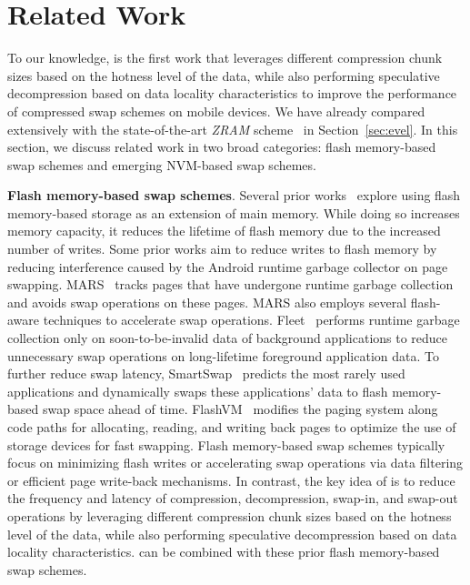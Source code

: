 \section{Related Work}

To our knowledge, \proposal is the first work that leverages different compression chunk sizes based on the hotness level of the data, while also performing speculative decompression based on data locality characteristics to improve the performance of compressed swap schemes on mobile devices.
We have already compared \proposal extensively with the state-of-the-art \emph{ZRAM} scheme~\cite{zram1} in Section~\ref{sec:evel}. In this section, we discuss related work in two broad categories: flash memory-based swap schemes and emerging NVM-based swap schemes.


\noindent\textbf{Flash memory-based swap schemes}.  
Several prior works~\cite{end2024more, bergman2022znswap, Changlong2020seal, guo2015mars, saxena2010flashvm, kim2017application, zhu2017revisiting, Samsung-Enable-Swap, Xiaomi-Enable-Swap, kim2019analysis} explore using flash memory-based storage as an extension of main memory. While doing so increases memory capacity, it reduces the lifetime of flash memory due to the increased number of writes. Some prior works\cite{guo2015mars,end2024more} aim to reduce writes to flash memory by reducing interference caused by the Android runtime garbage collector on page swapping.  MARS~\cite{guo2015mars} tracks pages that have undergone runtime garbage collection and avoids swap operations on these pages. MARS also employs several flash-aware techniques to accelerate swap operations. 
Fleet~\cite{end2024more} performs runtime garbage collection only on soon-to-be-invalid data of background applications to reduce unnecessary swap operations on long-lifetime foreground application data.
To further reduce swap latency, SmartSwap~\cite{zhu2017smartswap} predicts the most rarely used applications and dynamically swaps these applications' data to flash memory-based swap space ahead of time.
FlashVM~\cite{saxena2010flashvm} modifies the paging system along code paths for allocating, reading, and writing back pages to optimize the use of storage devices for fast swapping. Flash memory-based swap schemes typically focus on minimizing flash writes or accelerating swap operations via data filtering or efficient page write-back mechanisms. In contrast, the key idea of \proposal is to reduce the frequency and latency of compression, decompression, swap-in, and swap-out operations by leveraging different compression chunk sizes based on the hotness level of the data, while also performing speculative decompression based on data locality characteristics. \proposal can be combined with these prior flash memory-based swap schemes.



